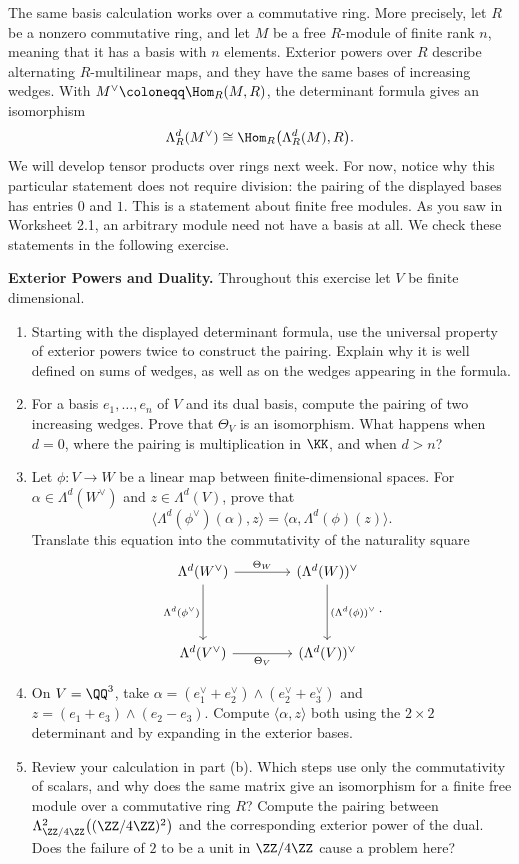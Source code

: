 \documentclass[12pt,reqno]{amsart}
\begin{document}
The same basis calculation works over a commutative ring. More precisely, let $R$ be a nonzero commutative ring, and let $M$ be a free $R$-module of finite rank $n$, meaning that it has a basis with $n$ elements. Exterior powers over $R$ describe alternating $R$-multilinear maps, and they have the same bases of increasing wedges. With $M^{\vee}\coloneqq\Hom_R(M,R)$, the determinant formula gives an isomorphism
\[
\Lambda_R^d(M^{\vee})\cong\Hom_R\big(\Lambda_R^d(M),R\big).
\]
We will develop tensor products over rings next week. For now, notice why this particular statement does not require division: the pairing of the displayed bases has entries $0$ and $1$. This is a statement about finite free modules. As you saw in Worksheet 2.1, an arbitrary module need not have a basis at all. We check these statements in the following exercise.

\hrulefill

\begin{problems}
\item\label{e:duality} \textbf{Exterior Powers and Duality.} Throughout this exercise let $V$ be finite dimensional.
\begin{enumerate}
\item Starting with the displayed determinant formula, use the universal property of exterior powers twice to construct the pairing. Explain why it is well defined on sums of wedges, as well as on the wedges appearing in the formula.
\item For a basis $e_1,\ldots,e_n$ of $V$ and its dual basis, compute the pairing of two increasing wedges. Prove that $\Theta_V$ is an isomorphism. What happens when $d=0$, where the pairing is multiplication in $\KK$, and when $d>n$?
\item Let $\phi:V\to W$ be a linear map between finite-dimensional spaces. For $\alpha\in\Lambda^d(W^{\vee})$ and $z\in\Lambda^d(V)$, prove that
\[
\big\langle\Lambda^d(\phi^{\vee})(\alpha),z\big\rangle=\big\langle\alpha,\Lambda^d(\phi)(z)\big\rangle.
\]
Translate this equation into the commutativity of the naturality square
\[
\begin{tikzcd}[row sep=4em,column sep=4em]
\Lambda^d(W^{\vee}) \arrow[r,"\Theta_W"] \arrow[d,"\Lambda^d(\phi^{\vee})"'] & (\Lambda^d(W))^{\vee} \arrow[d,"(\Lambda^d(\phi))^{\vee}"]\\
\Lambda^d(V^{\vee}) \arrow[r,"\Theta_V"'] & (\Lambda^d(V))^{\vee}
\end{tikzcd}.
\]
\item On $V=\QQ^3$, take $\alpha=(e_1^{\vee}+e_2^{\vee})\wedge(e_2^{\vee}+e_3^{\vee})$ and $z=(e_1+e_3)\wedge(e_2-e_3)$. Compute $\langle\alpha,z\rangle$ both using the $2\times2$ determinant and by expanding in the exterior bases.
\item Review your calculation in part (b). Which steps use only the commutativity of scalars, and why does the same matrix give an isomorphism for a finite free module over a commutative ring $R$? Compute the pairing between $\Lambda^2_{\ZZ/4\ZZ}\big((\ZZ/4\ZZ)^2\big)$ and the corresponding exterior power of the dual. Does the failure of $2$ to be a unit in $\ZZ/4\ZZ$ cause a problem here?
\end{enumerate}
\end{problems}
\end{document}
